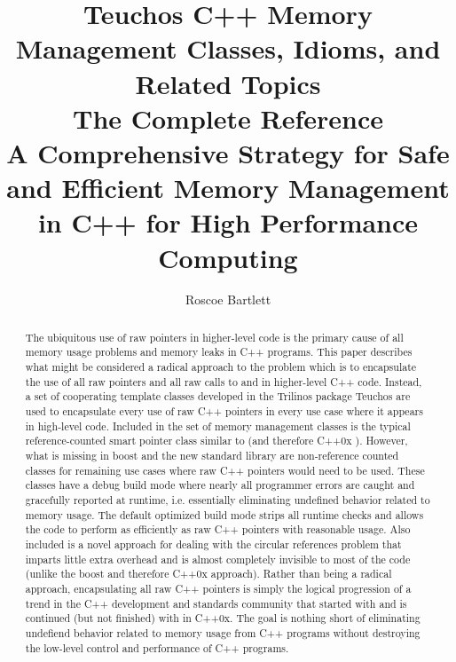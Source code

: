 \documentclass[pdf,ps2pdf,11pt]{SANDreport}
\title{\center
Teuchos C++ Memory Management Classes, Idioms, and Related Topics
\\[2ex] The Complete Reference \\[2ex] {\Large A Comprehensive Strategy for
Safe and Efficient Memory Management in C++ for High Performance
Computing} }
\author{
Roscoe Bartlett
}
\date{}
\begin{document}

\maketitle


%


%
\begin{abstract}
%


The ubiquitous use of raw pointers in higher-level code is the primary
cause of all memory usage problems and memory leaks in C++
programs. This paper describes what might be considered a radical
approach to the problem which is to encapsulate the use of all raw
pointers and all raw calls to {} and {} in
higher-level C++ code.  Instead, a set of cooperating template classes
developed in the Trilinos package Teuchos are used to encapsulate
every use of raw C++ pointers in every use case where it appears in
high-level code.  Included in the set of memory management classes is
the typical reference-counted smart pointer class similar to
{} (and therefore C++0x
{}).  However, what is missing in boost and the
new standard library are non-reference counted classes for remaining
use cases where raw C++ pointers would need to be used.  These classes
have a debug build mode where nearly all programmer errors are caught
and gracefully reported at runtime, i.e. essentially eliminating
undefined behavior related to memory usage.  The default optimized
build mode strips all runtime checks and allows the code to perform as
efficiently as raw C++ pointers with reasonable usage.  Also included
is a novel approach for dealing with the circular references problem
that imparts little extra overhead and is almost completely invisible
to most of the code (unlike the boost and therefore C++0x approach).
Rather than being a radical approach, encapsulating all raw C++
pointers is simply the logical progression of a trend in the C++
development and standards community that started with
{} and is continued (but not finished) with
{} in C++0x.  The goal is nothing short of
eliminating undefiend behavior related to memory usage from C++
programs without destroying the low-level control and performance of
C++ programs.

%
\end{abstract}
%
\end{document}
